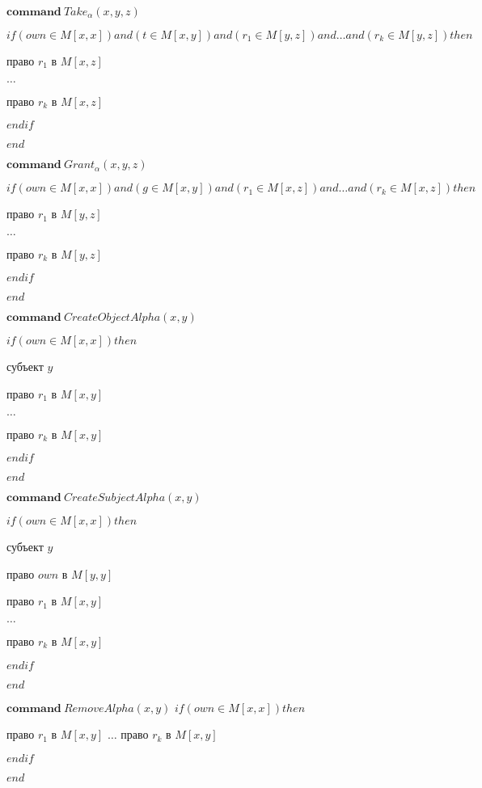 \begin{multicols}{2}
	\begin{itemize*}
		\item $\mathbf{command} \  Take_{\alpha}(x,y,z)$

		$if (own \in M[x,x]) and (t \in M[x,y])and (r_1 \in M[y,z])and  \ldots and (r_k \in M[y,z]) then $

		 право $r_1$ в $M[x,z]$

		$\ldots$

		 право $r_k$ в $M[x,z]$

		$endif$

		$end$

		\item 		$\mathbf{command} \  Grant_{\alpha}(x,y,z)$

				$if (own \in M[x,x]) and (g \in M[x,y])and (r_1 \in M[x,z])and  \ldots and (r_k \in M[x,z]) then $

				 право $r_1$ в $M[y,z]$

				$\ldots$

				 право $r_k$ в $M[y,z]$

				$endif$

				$end$
		\end{itemize*}
		\begin{itemize*}
		\item 		$\mathbf{command} \ CreateObjectAlpha(x,y)$

				$if (own \in M[x,x]) then $

				 субъект $y$

				 право $r_1$ в $M[x,y]$

				$\ldots$

				 право $r_k$ в $M[x,y]$

				$endif$

				$end$

		\item 		$\mathbf{command} \ CreateSubjectAlpha(x,y)$

				$if (own \in M[x,x]) then $

				 субъект $y$

				 право $own$ в $M[y,y]$

				 право $r_1$ в $M[x,y]$

				$\ldots$

				 право $r_k$ в $M[x,y]$

				$endif$

				$end$
			\end{itemize*}
			\begin{itemize*}

			\item 		$\mathbf{command} \ RemoveAlpha(x,y)$
					$if (own \in M[x,x]) then $

					 право $r_1$ в $M[x,y]$
					$\ldots$
					 право $r_k$ в $M[x,y]$

					$endif$

					$end$

	\end{itemize*}

\end{multicols}

